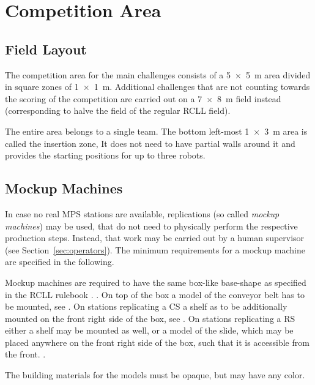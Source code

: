 \documentclass[12pt,twoside]{article}
\newcommand{\refsec}[1]{Section~\ref{#1}}
\begin{document}
\section{Competition Area}
\subsection{Field Layout}
The competition area for the main challenges consists of a \SI{5 x 5}{\metre}
area divided in square zones of \SI{1 x 1}{\metre}. Additional challenges that
are not counting towards the scoring of the competition are carried out on
a \SI{7 x 8}{\metre} field instead (corresponding to halve the field of the
regular \ac{RCLL} field).


The entire area belongs to a single team. The bottom left-most
\SI{1 x 3}{\metre} area is called the insertion zone, It does not need to have
partial walls around it and provides the starting positions for up to three
robots.

\subsection{Mockup Machines}\label{sec:machines}
In case no real \ac{MPS} stations are available, replications
(so called \emph{mockup machines}) may be used, that do not need to
physically perform the respective production steps. Instead, that work may
be carried out by a human supervisor (see \refsec{sec:operators}).
The minimum requirements for a mockup machine are specified in the following.

Mockup machines are required to have the same box-like base-shape as specified
in the RCLL rulebook .
.
On top of the box a model of the conveyor belt has to be mounted, see
.
On stations replicating a \ac{CS} a shelf as to be additionally mounted on the
front right side of the box, see
.
On stations replicating a \ac{RS} either a shelf may be mounted as well,
or a model of the slide, which may be placed anywhere on the front right side
of the box, such that it is accessible from the front.
.

The building materials for the models must be opaque, but may have any color.
\end{document}
